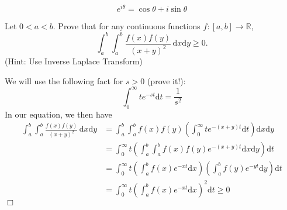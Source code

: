 $$e^{i \theta} = \cos {\theta} + i \sin {\theta} $$

\begin{problem}[R][9][MIT 18/A34]
    Let $0 < a < b$. Prove that for any continuous functions $f \colon [a,b] \rightarrow \mathbb{R}$, 
    \[\int_{a}^{b}\int_{a}^{b} \frac{f(x)f(y)}{(x+y)^2} \, \mathrm{d}x \mathrm{d}y \geq 0.\]
    (Hint: Use Inverse Laplace Transform)
\end{problem}

\begin{solution}
    We will use the following fact for $s>0$ (prove it!):
    $$ \int_0^{\infty} te^{-st} \mathrm{d}t = \frac{1}{s^2}$$
    In our equation, we then have
    \begin{align*}
        \int_{a}^{b}\int_{a}^{b} \frac{f(x)f(y)}{(x+y)^2} \, \mathrm{d}x \mathrm{d}y &= \int_{a}^{b}\int_{a}^{b} f(x)f(y) \left( \int_{0}^{\infty} te^{-(x+y)t} \mathrm{d}t \right) \mathrm{d}x \mathrm{d}y \\
        &= \int_{0}^{\infty} t \left(  \int_{a}^{b}\int_{a}^{b} f(x)f(y) e^{-(x+y)t} \mathrm{d}x \mathrm{d}y \right)  \mathrm{d}t \\
        &= \int_{0}^{\infty} t \left(  \int_{a}^{b} f(x) e^{-xt} \mathrm{d}x\right) \left(  \int_{a}^{b} f(y) e^{-yt} \mathrm{d}y\right)  \mathrm{d}t \\
        &= \int_{0}^{\infty} t \left(  \int_{a}^{b} f(x) e^{-xt} \mathrm{d}x\right)^2 \mathrm{d}t \geq 0
    \end{align*}
    $\Box$
\end{solution}

